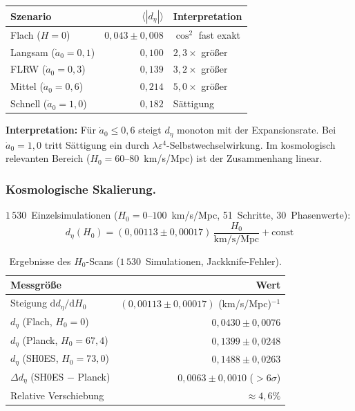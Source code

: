 \documentclass[12pt]{iopart}
\begin{document}
	\begin{center}
		\begin{tabular}{lrl}
			\hline
			\textbf{Szenario}
			& $\langle|d_\eta|\rangle$
			& \textbf{Interpretation} \\
			\hline
			Flach ($H = 0$)
			& $0{,}043 \pm 0{,}008$
			& $\cos^2$ fast exakt \\
			Langsam ($\dot{a}_0 = 0{,}1$)
			& $0{,}100$
			& $2{,}3\times$ gr\"o\ss{}er \\
			FLRW ($\dot{a}_0 = 0{,}3$)
			& $0{,}139$
			& $3{,}2\times$ gr\"o\ss{}er \\
			Mittel ($\dot{a}_0 = 0{,}6$)
			& $0{,}214$
			& $5{,}0\times$ gr\"o\ss{}er \\
			Schnell ($\dot{a}_0 = 1{,}0$)
			& $0{,}182$
			& S\"attigung \\
			\hline
		\end{tabular}
	\end{center}
	
	\noindent
	\textbf{Interpretation:}
	F\"ur $\dot{a}_0 \leq 0{,}6$ steigt $d_\eta$ monoton
	mit der Expansionsrate. Bei $\dot{a}_0 = 1{,}0$ tritt
	S\"attigung ein durch
	$\lambda\varepsilon^4$-Selbstwechselwirkung.
	Im kosmologisch relevanten Bereich
	($H_0 = 60$--$80$~km/s/Mpc) ist der
	Zusammenhang linear.
	
	\subsubsection{Kosmologische Skalierung.}
	
	$1\,530$~Einzelsimulationen
	($H_0 = 0$--$100$~km/s/Mpc, 51~Schritte,
	30~Phasenwerte):
	\begin{equation}
		d_\eta(H_0) = (0{,}00113 \pm 0{,}00017)\,
		\frac{H_0}{\mathrm{km/s/Mpc}}
		+ \mathrm{const}
		\label{eq:d_eta_h0}
	\end{equation}
	
	\begin{table}[ht]
		\centering
		\caption{Ergebnisse des $H_0$-Scans
			($1\,530$~Simulationen,
			Jackknife-Fehler).}
		\label{tab:h0_scan}
		\begin{tabular}{lr}
			\hline
			\textbf{Messgr\"o\ss{}e}
			& \textbf{Wert} \\
			\hline
			Steigung $\mathrm{d}d_\eta
			/ \mathrm{d}H_0$
			& $(0{,}00113 \pm 0{,}00017)$
			(km/s/Mpc)$^{-1}$ \\
			$d_\eta$ (Flach, $H_0 = 0$)
			& $0{,}0430 \pm 0{,}0076$ \\
			$d_\eta$ (Planck, $H_0 = 67{,}4$)
			& $0{,}1399 \pm 0{,}0248$ \\
			$d_\eta$ (SH0ES, $H_0 = 73{,}0$)
			& $0{,}1488 \pm 0{,}0263$ \\
			$\Delta d_\eta$ (SH0ES $-$ Planck)
			& $0{,}0063 \pm 0{,}0010$
			($>6\sigma$) \\
			Relative Verschiebung
			& $\approx 4{,}6\%$ \\
			\hline
		\end{tabular}
	\end{table}
	
\end{document}
